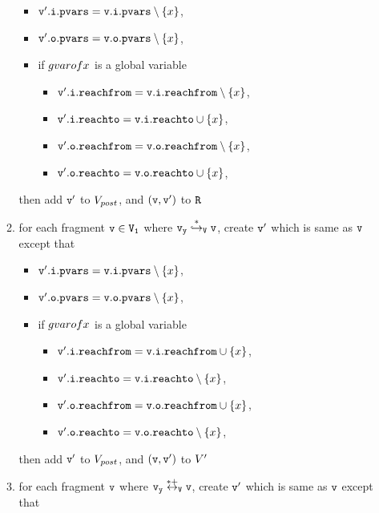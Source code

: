 \begin{itemize}
\begin{enumerate}
\begin{itemize}
\item $\mathtt{v}'.\mathtt{i}.\mathtt{pvars} = \mathtt{v}.\mathtt{i}.\mathtt{pvars} \setminus \left\{x\right\}$,
\item $\mathtt{v}'.\mathtt{o}.\mathtt{pvars} = \mathtt{v}.\mathtt{o}.\mathtt{pvars} \setminus \left\{x\right\}$,
\item if $\\gvarof{x}$ is a global variable
\begin{itemize}
\item $\mathtt{v}'.\mathtt{i}.\mathtt{reachfrom} = \mathtt{v}.\mathtt{i}.\mathtt{reachfrom} \setminus \left\{x\right\}$,
\item $\mathtt{v}'.\mathtt{i}.\mathtt{reachto} = \mathtt{v}.\mathtt{i}.\mathtt{reachto} \cup \left\{x\right\}$,
\item $\mathtt{v}'.\mathtt{o}.\mathtt{reachfrom} = \mathtt{v}.\mathtt{o}.\mathtt{reachfrom} \setminus \left\{x\right\}$,
\item $\mathtt{v}'.\mathtt{o}.\mathtt{reachto} = \mathtt{v}.\mathtt{o}.\mathtt{reachto} \cup \left\{x\right\}$,
\end{itemize}
\end{itemize}
then add $\tt v'$ to $V_{post}$, and $\tt (v,v')$ to $\tt R$
\item for each fragment $\tt v \in V_1$ where $\tt \mathtt{v}_y \overset{*}\hookrightarrow_{V} v$, create $\tt v'$ which is same as $\tt v$ except that
\begin{itemize}
\item $\mathtt{v}'.\mathtt{i}.\mathtt{pvars} = \mathtt{v}.\mathtt{i}.\mathtt{pvars} \setminus \left\{x\right\}$,
\item $\mathtt{v}'.\mathtt{o}.\mathtt{pvars} = \mathtt{v}.\mathtt{o}.\mathtt{pvars} \setminus \left\{x\right\}$,
\item if $\\gvarof{x}$ is a global variable
\begin{itemize}
\item $\mathtt{v}'.\mathtt{i}.\mathtt{reachfrom} = \mathtt{v}.\mathtt{i}.\mathtt{reachfrom} \cup \left\{x\right\}$,
\item $\mathtt{v}'.\mathtt{i}.\mathtt{reachto} = \mathtt{v}.\mathtt{i}.\mathtt{reachto} \setminus \left\{x\right\}$,
 \item $\mathtt{v}'.\mathtt{o}.\mathtt{reachfrom} = \mathtt{v}.\mathtt{o}.\mathtt{reachfrom} \cup \left\{x\right\}$,
 \item $\mathtt{v}'.\mathtt{o}.\mathtt{reachto} = \mathtt{v}.\mathtt{o}.\mathtt{reachto} \setminus \left\{x\right\}$,
\end{itemize}
\end{itemize}
then add $\tt v'$ to $V_{post}$, and $\tt (v,v')$ to $V'$
\item for each fragment $\tt v$ where $\tt \mathtt{v}_y \overset{*+}\leftrightarrow_{V} v$, create $\tt v'$ which is same as $\tt v$ except that

\end{enumerate}
\end{itemize}
